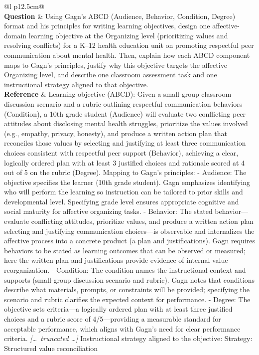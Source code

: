\begin{longtable}{@{}l p{12.5cm}@{}}
   \\
  \textbf{Question} & Using Gagn's ABCD (Audience, Behavior, Condition, Degree) format and his principles for writing learning objectives, design one affective-domain learning objective at the Organizing level (prioritizing values and resolving conflicts) for a K--12 health education unit on promoting respectful peer communication about mental health. Then, explain how each ABCD component maps to Gagn's principles, justify why this objective targets the affective Organizing level, and describe one classroom assessment task and one instructional strategy aligned to that objective. \\
  \textbf{Reference} & Learning objective (ABCD): Given a small-group classroom discussion scenario and a rubric outlining respectful communication behaviors (Condition), a 10th grade student (Audience) will evaluate two conflicting peer attitudes about disclosing mental health struggles, prioritize the values involved (e.g., empathy, privacy, honesty), and produce a written action plan that reconciles those values by selecting and justifying at least three communication choices consistent with respectful peer support (Behavior), achieving a clear, logically ordered plan with at least 3 justified choices and rationale scored at 4 out of 5 on the rubric (Degree). \newline Mapping to Gagn's principles: \newline - Audience: The objective specifies the learner (10th grade student). Gagn emphasizes identifying who will perform the learning so instruction can be tailored to prior skills and developmental level. Specifying grade level ensures appropriate cognitive and social maturity for affective organizing tasks. \newline - Behavior: The stated behavior---evaluate conflicting attitudes, prioritize values, and produce a written action plan selecting and justifying communication choices---is observable and internalizes the affective process into a concrete product (a plan and justifications). Gagn requires behaviors to be stated as learning outcomes that can be observed or measured; here the written plan and justifications provide evidence of internal value reorganization. \newline - Condition: The condition names the instructional context and supports (small-group discussion scenario and rubric). Gagn notes that conditions describe what materials, prompts, or constraints will be provided; specifying the scenario and rubric clarifies the expected context for performance. \newline - Degree: The objective sets criteria---a logically ordered plan with at least three justified choices and a rubric score of 4/5---providing a measurable standard for acceptable performance, which aligns with Gagn's need for clear performance criteria. \newline \textit{[\ldots\ truncated \ldots]} \newline Instructional strategy aligned to the objective: \newline Strategy: Structured value reconciliation 
\end{longtable}
